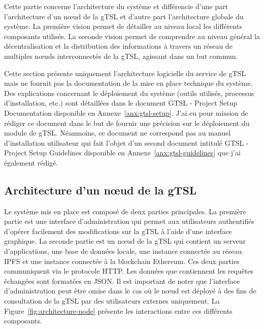 \documentclass{tnreport}
\begin{document}
Cette partie concerne l'architecture du système et différencie d'une part l'architecture d'un nœud de la gTSL et d'autre part l'architecture globale du système. La première vision permet de détailler au niveau local les différents composants utilisés. La seconde vision permet de comprendre au niveau général la décentralisation et la distribution des informations à travers un réseau de multiples nœuds interconnectés de la gTSL, agissant dans un but commun.

Cette section présente uniquement l'architecture logicielle du service de gTSL mais ne fournit pas la documentation de la mise en place technique du système. Des explications concernant le déploiement du système (outils utilisés, processus d'installation, etc.) sont détaillées dans le document GTSL - Project Setup Documentation disponible en Annexe~\ref{anx:gtsl-setup}. J'ai eu pour mission de rédiger ce document dans le but de fournir une précision sur le déploiement du module de gTSL. Néanmoins, ce document ne correspond pas au manuel d'installation utilisateur qui fait l'objet d'un second document intitulé GTSL - Project Setup Guidelines disponible en Annexe~\ref{anx:gtsl-guidelines} que j'ai également rédigé.

\subsection{Architecture d'un nœud de la gTSL}

Le système mis en place est composé de deux parties principales. La première partie est une interface d'administration qui permet aux utilisateurs authentifiés d'opérer facilement des modifications sur la gTSL à l'aide d'une interface graphique. La seconde partie est un nœud de la gTSL qui contient un serveur d'applications, une base de données locale, une instance connectée au réseau IPFS et une instance connectée à la blockchain Ethereum. Ces deux parties communiquent via le protocole HTTP. Les données que contiennent les requêtes échangées sont formatées en JSON. Il est important de noter que l'interface d'administration peut être omise dans le cas où le nœud est déployé à des fins de consultation de la gTSL par des utilisateurs externes uniquement. La Figure~\ref{fig:architecture-node} présente les interactions entre ces différents composants.
\clearpage
\end{document}
